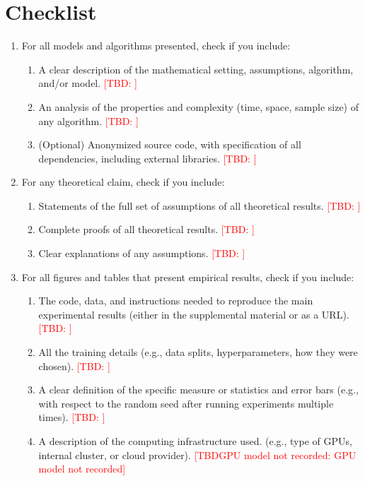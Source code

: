\documentclass[twoside]{article}
\newcommand{\TBD}[1]{\textcolor{red}{[TBD\ifx\relax#1\relax\else: #1\fi]}}
\begin{document}
\section*{Checklist}

\begin{enumerate}

  \item For all models and algorithms presented, check if you include:
  \begin{enumerate}
    \item A clear description of the mathematical setting, assumptions, algorithm, and/or model. \TBD{}
    \item An analysis of the properties and complexity (time, space, sample size) of any algorithm. \TBD{}
    \item (Optional) Anonymized source code, with specification of all dependencies, including external libraries. \TBD{}
  \end{enumerate}

  \item For any theoretical claim, check if you include:
  \begin{enumerate}
    \item Statements of the full set of assumptions of all theoretical results. \TBD{}
    \item Complete proofs of all theoretical results. \TBD{}
    \item Clear explanations of any assumptions. \TBD{}
  \end{enumerate}

  \item For all figures and tables that present empirical results, check if you include:
  \begin{enumerate}
    \item The code, data, and instructions needed to reproduce the main experimental results (either in the supplemental material or as a URL). \TBD{}
    \item All the training details (e.g., data splits, hyperparameters, how they were chosen). \TBD{}
    \item A clear definition of the specific measure or statistics and error bars (e.g., with respect to the random seed after running experiments multiple times). \TBD{}
    \item A description of the computing infrastructure used. (e.g., type of GPUs, internal cluster, or cloud provider). \TBD{GPU model not recorded}
  \end{enumerate}


\end{enumerate}
\end{document}
